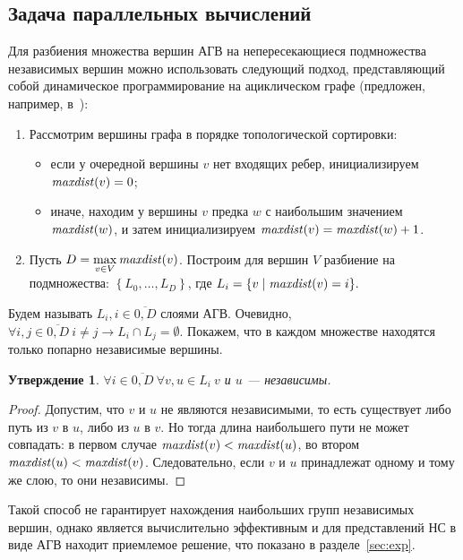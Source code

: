 \subsection{Задача параллельных вычислений}
\label{subsec:literature:parallel}

Для разбиения множества вершин АГВ на непересекающиеся подмножества независимых
вершин можно использовать следующий подход, представляющий собой динамическое
программирование на ациклическом графе (предложен, например,
в~\cite{node_level_par}):
\begin{enumerate}
    \item Рассмотрим вершины графа в порядке топологической сортировки:
        \begin{itemize}
            \item если у очередной вершины $v$ нет входящих ребер,
            инициализируем $\mathop{\mathit{maxdist}}\nolimits(v) = 0$;
            \item иначе, находим у вершины $v$ предка $w$ с наибольшим значением
            $\mathop{\mathit{maxdist}}\nolimits(w)$, и затем инициализируем
            $\mathop{\mathit{maxdist}}\nolimits(v) = \mathop{\mathit{maxdist}}\nolimits(w)+1$.
        \end{itemize}
    \item Пусть $D=\max\limits_{v \in V}\mathop{\mathit{maxdist}}\nolimits(v)$. Построим для
    вершин $V$ разбиение на подмножества: $\left\{L_0,\ldots,L_D\right\}$, где
    $L_i = \{v \mid \mathop{\mathit{maxdist}}\nolimits(v) = i\}.$
\end{enumerate}
Будем называть $L_i, i\in\overline{0,D}$ слоями АГВ. Очевидно, $\forall
i,j\in\overline{0,D}\ i\not=j \rightarrow L_i \cap L_j = \emptyset$. Покажем,
что в каждом множестве находятся только попарно независимые вершины.

\newtheorem{statement}{Утверждение}
\begin{statement}
    \label{statement:maxdist}
    $\forall i\in\overline{0,D}\ \forall v,u \in L_i\ v$ и $u$ — независимы.
\end{statement}
\begin{proof}
    Допустим, что $v$ и $u$ не являются независимыми, то есть существует либо
    путь из $v$ в $u$, либо из $u$ в $v$. Но тогда длина наибольшего пути не
    может совпадать: в первом случае $\mathop{\mathit{maxdist}}\nolimits(v) <
    \mathop{\mathit{maxdist}}\nolimits(u)$, во втором $\mathop{\mathit{maxdist}}\nolimits(u) <
    \mathop{\mathit{maxdist}}\nolimits(v)$. Следовательно, если $v$ и $u$ принадлежат одному
    и тому же слою, то они независимы.
\end{proof}

Такой способ не гарантирует нахождения наибольших групп независимых вершин,
однако является вычислительно эффективным и для представлений НС в виде АГВ
находит приемлемое решение, что показано в разделе~\ref{sec:exp}.
